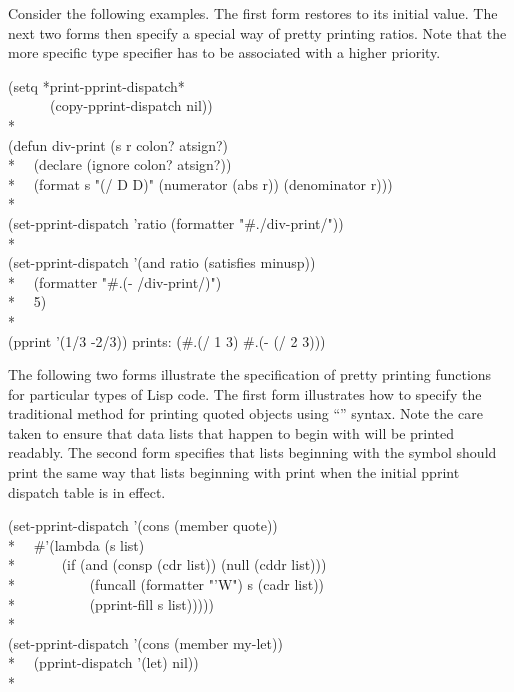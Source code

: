 Consider the following examples.  The first form restores
 to its initial value.
The next two forms then specify a special way of pretty printing ratios.  Note that the more specific type
specifier has to be associated with a higher priority.
\begin{lisp}
(setq *print-pprint-dispatch* \\
~~~~~~(copy-pprint-dispatch nil)) \\*
\\
(defun div-print (s r colon? atsign?) \\*
~~(declare (ignore colon? atsign?)) \\*
~~(format s "(/ {\Xtilde}D {\Xtilde}D)" (numerator (abs r)) (denominator r))) \\*
\\
(set-pprint-dispatch 'ratio (formatter "\#.\Xtilde/div-print/")) \\*
\\
(set-pprint-dispatch '(and ratio (satisfies minusp)) \\*
~~(formatter "\#.(- \Xtilde/div-print/)") \\*
~~5) \\*
\\
(pprint '(1/3 -2/3)) \textrm{prints:} (\#.(/ 1 3) \#.(- (/ 2 3)))
\end{lisp}

The following two forms illustrate the specification of pretty printing
functions for particular types of Lisp code.  The first form illustrates how to
specify the traditional method for printing quoted objects using ``''
syntax.  Note the care taken to ensure that data lists that happen to begin
with  will be printed readably.  The second form specifies that lists
beginning with the symbol  should print the same way that lists
beginning with  print when the initial pprint dispatch table is in effect.
\begin{lisp}
(set-pprint-dispatch '(cons (member quote)) \\*
~~\#'(lambda (s list) \\*
~~~~~~(if (and (consp (cdr list)) (null (cddr list))) \\*
~~~~~~~~~~(funcall (formatter "'{\Xtilde}W") s (cadr list)) \\*
~~~~~~~~~~(pprint-fill s list))))) \\*
\\
(set-pprint-dispatch '(cons (member my-let)) \\*
~~(pprint-dispatch '(let) nil)) \\*
\end{lisp}

